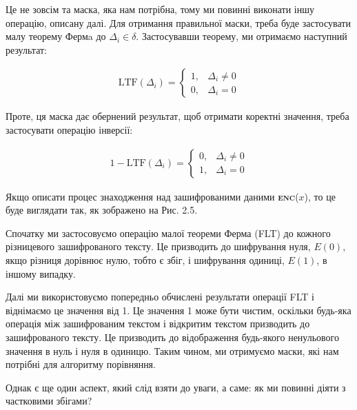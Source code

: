 \begin{itemize}
{Це не зовсім та маска, яка нам потрібна, тому ми повинні виконати іншу операцію, описану далі.
Для отримання правильної маски, треба буде застосувати малу теорему Фермa  \cite{Fermat} до
\(\Delta_i \in \delta\). Застосувавши теорему, ми отримаємо наступний результат:

\begin{align*}
\text{LTF}(\Delta_i) =
\begin{cases} 
    1, & \Delta_i \neq 0 \\
    0, & \Delta_i = 0
\end{cases}
\end{align*}

Проте, ця маска дає обернений результат, щоб отримати коректні значення, треба застосувати
операцію інверсії:

\begin{align*}
1- \text{LTF}(\Delta_i) =
\begin{cases} 
    0, & \Delta_i \neq 0 \\
    1, & \Delta_i = 0
\end{cases}
\end{align*}

Якщо описати процес знаходження над зашифрованими даними \textsc{\textbf{enc}}(\(x\)), то це
буде виглядати так, як зображено на Рис. 2.5.

Спочатку ми застосовуємо операцію малої теореми Ферма (FLT) \cite{Fermat} до кожного різницевого
зашифрованого тексту. Це призводить до шифрування нуля, \(E(0)\), якщо різниця дорівнює нулю,
тобто є збіг, і шифрування одиниці, \(E(1)\), в іншому випадку.

Далі ми використовуємо попередньо обчислені результати операції FLT і віднімаємо це значення від
1. Це значення 1 може бути чистим, оскільки будь-яка операція між зашифрованим текстом і
відкритим текстом призводить до зашифрованого тексту. Це призводить до відображення будь-якого
ненульового значення в нуль і нуля в одиницю. Таким чином, ми отримуємо маски, які нам потрібні
для алгоритму порівняння. 

Однак є ще один аспект, який слід взяти до уваги, а саме: як ми повинні діяти з частковими збігами?

}
\end{itemize}
